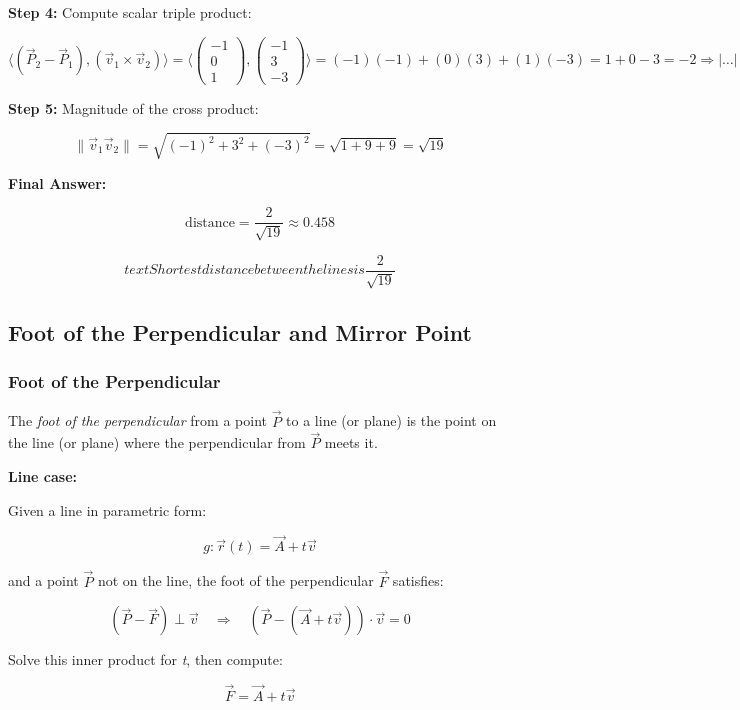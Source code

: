 \textbf{Step 4:} Compute scalar triple product:

\[
	\langle(\vec{P}_2 - \vec{P}_1), (\vec{v}_1 \times \vec{v}_2)\rangle =
	\langle\begin{pmatrix} -1 \\ 0 \\ 1 \end{pmatrix}, \begin{pmatrix} -1 \\ 3 \\ -3 \end{pmatrix}\rangle
	= (-1)(-1) + (0)(3) + (1)(-3) = 1 + 0 - 3 = -2
	\Rightarrow |\dots| = 2
\]

\textbf{Step 5:} Magnitude of the cross product:

\[
	\|\vec{v}_1  \vec{v}_2\|= \sqrt{(-1)^2 + 3^2 + (-3)^2} = \sqrt{1 + 9 + 9} = \sqrt{19}
\]

\textbf{Final Answer:}

\[
	\text{distance} = \frac{2}{\sqrt{19}} \approx 0.458
\]

\[
text{Shortest distance between the lines is } \frac{2}{\sqrt{19}}
\]

\subsection{Foot of the Perpendicular and Mirror Point}

\subsubsection{Foot of the Perpendicular}

The \emph{foot of the perpendicular} from a point \(\vec{P}\) to a line (or plane) is the point on the line (or plane) where the perpendicular from \(\vec{P}\) meets it.
\vspace{\baselineskip}

\textbf{Line case:}

Given a line in parametric form:

\[
	g: \vec{r}(t) = \vec{A} + t\vec{v}
\]

and a point \(\vec{P}\) not on the line, the foot of the perpendicular \(\vec{F}\) satisfies:

\[
	(\vec{P} - \vec{F}) \perp \vec{v} \quad \Rightarrow \quad (\vec{P} - (\vec{A} + t\vec{v})) \cdot \vec{v} = 0
\]

Solve this inner product for \emph{t}, then compute:

\[
	\vec{F} = \vec{A} + t\vec{v}
\]

